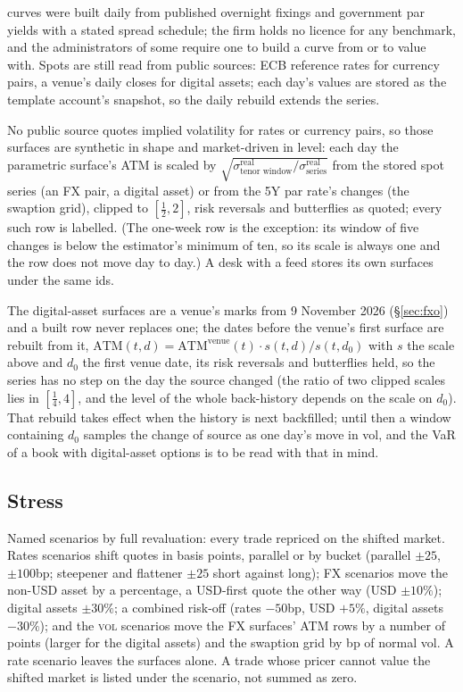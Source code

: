 \documentclass[11pt,a4paper]{article}
\let\plainsubsection\subsection
\renewcommand{\subsection}{\needspace{5\baselineskip}\plainsubsection}
\begin{document}
curves were built daily from published overnight fixings and government par yields with a stated spread schedule; the firm holds no licence for any benchmark, and the administrators of some require one to build a curve from or to value with. Spots are still read from public sources: ECB reference rates for currency pairs, a venue's daily closes for digital assets; each day's values are stored as the template account's snapshot, so the daily rebuild extends the series.

No public source quotes implied volatility for rates or currency pairs, so those surfaces are synthetic in shape and market-driven in level: each day the parametric surface's ATM is scaled by $\sqrt{\sigma^{\text{real}}_{\text{tenor window}}/\sigma^{\text{real}}_{\text{series}}}$ from the stored spot series (an FX pair, a digital asset) or from the 5Y par rate's changes (the swaption grid), clipped to $[\tfrac12,2]$, risk reversals and butterflies as quoted; every such row is labelled. (The one-week row is the exception: its window of five changes is below the estimator's minimum of ten, so its scale is always one and the row does not move day to day.) A desk with a feed stores its own surfaces under the same ids.

The digital-asset surfaces are a venue's marks from 9 November 2026 (\S\ref{sec:fxo}) and a built row never replaces one; the dates before the venue's first surface are rebuilt from it, $\mathrm{ATM}(t,d)=\mathrm{ATM}^{\text{venue}}(t)\cdot s(t,d)/s(t,d_0)$ with $s$ the scale above and $d_0$ the first venue date, its risk reversals and butterflies held, so the series has no step on the day the source changed (the ratio of two clipped scales lies in $[\tfrac14,4]$, and the level of the whole back-history depends on the scale on $d_0$). That rebuild takes effect when the history is next backfilled; until then a window containing $d_0$ samples the change of source as one day's move in vol, and the VaR of a book with digital-asset options is to be read with that in mind.

\subsection{Stress}
Named scenarios by full revaluation: every trade repriced on the shifted market. Rates scenarios shift quotes in basis points, parallel or by bucket (parallel $\pm25$, $\pm100$bp; steepener and flattener $\pm25$ short against long); FX scenarios move the non-USD asset by a percentage, a USD-first quote the other way (USD $\pm10\%$); digital assets $\pm30\%$; a combined risk-off (rates $-50$bp, USD $+5\%$, digital assets $-30\%$); and the \textsc{vol} scenarios move the FX surfaces' ATM rows by a number of points (larger for the digital assets) and the swaption grid by bp of normal vol. A rate scenario leaves the surfaces alone. A trade whose pricer cannot value the shifted market is listed under the scenario, not summed as zero.
\end{document}
